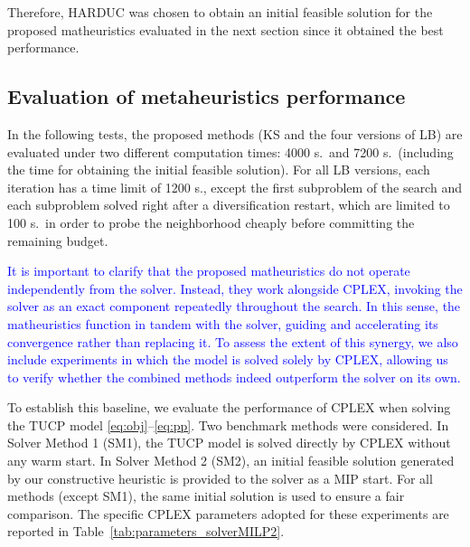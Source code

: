 Therefore, HARDUC was chosen to obtain an initial feasible solution for the proposed matheuristics evaluated in the next section since it obtained the best performance.





\subsection{Evaluation of metaheuristics performance}
\label{section:Test2}

In the following tests, the proposed methods (KS and the four versions of LB) are evaluated under two different computation times: 4000 s.\ and 7200 s.\ (including the time for obtaining the initial feasible solution). For all LB versions, each iteration has a time limit of 1200 s., except the first
subproblem of the search and each subproblem solved right after a diversification restart, which are
limited to 100 s.\ in order to probe the neighborhood cheaply before committing the remaining budget.


\textcolor{blue}{
It is important to clarify that the proposed matheuristics do not operate independently from the solver. Instead, they work alongside CPLEX, invoking the solver as an exact component repeatedly throughout the search. In this sense, the matheuristics function in tandem with the solver, guiding and accelerating its convergence rather than replacing it. To assess the extent of this synergy, we also include experiments in which the model is solved solely by CPLEX, allowing us to verify whether the combined methods indeed outperform the solver on its own.
}

\color{blue}

To establish this baseline, we evaluate the performance of CPLEX when solving the TUCP model \eqref{eq:obj}–\eqref{eq:pp}. Two benchmark methods were considered. In Solver Method 1 (SM1), the TUCP model is solved directly by CPLEX without any warm start. In Solver Method 2 (SM2), an initial feasible solution generated by our constructive heuristic is provided to the solver as a MIP start. For all methods (except SM1), the same initial solution is used to ensure a fair comparison. The specific CPLEX parameters adopted for these experiments are reported in Table~\ref{tab:parameters_solverMILP2}.
\color{black}

